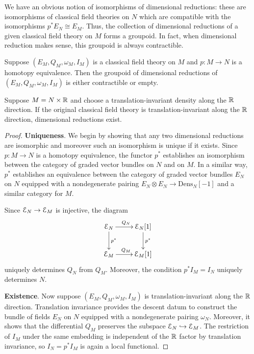 \documentclass[10pt, oneside]{article}
\newcommand{\Dens}{\mathrm{Dens}}
\begin{document}
We have an obvious notion of isomorphisms of dimensional reductions: these are isomorphisms of classical field theories on $N$ which are compatible with the isomorphisms $p^* E_N\cong E_M$. Thus, the collection of dimensional reductions of a given classical field theory on $M$ forms a groupoid.  In fact, when dimensional reduction makes sense, this groupoid is always contractible.

\begin{prop}
Suppose $(E_M, Q_M, \omega_M, I_M)$ is a classical field theory on $M$ and $p\colon M\rightarrow N$ is a homotopy equivalence. Then the groupoid of dimensional reductions of $(E_M, Q_M, \omega_M, I_M)$ is either contractible or empty.

Suppose $M=N\times \mathbb R$ and choose a translation-invariant density along the $\mathbb R$ direction. If the original classical field theory is translation-invariant along the $\mathbb R$ direction, dimensional reductions exist.
\label{prop:dimensionalreductionunique}
\end{prop}
\begin{proof} \textbf{Uniqueness}. We begin by showing that any two dimensional reductions are isomorphic and moreover such an isomorphism is unique if it exists. Since $p\colon M\rightarrow N$ is a homotopy equivalence, the functor $p^*$ establishes an isomorphism between the category of graded vector bundles on $N$ and on $M$. In a similar way, $p^*$ establishes an equivalence between the category of graded vector bundles $E_N$ on $N$ equipped with a nondegenerate pairing $E_N\otimes E_N\rightarrow \Dens_N[-1]$ and a similar category for $M$.

Since $\mathcal E_N\rightarrow \mathcal E_M$ is injective, the diagram
\[
\xymatrix{
\cE_N \ar^{Q_N}[r] \ar^{p^*}[d] & \cE_N[1] \ar^{p^*}[d] \\
\cE_M \ar^{Q_M}[r] & \cE_M[1]
}
\]
uniquely determines $Q_N$ from $Q_M$. Moreover, the condition $p^* I_M = I_N$ uniquely determines $N$.

\textbf{Existence}. Now suppose $(E_M, Q_M, \omega_M, I_M)$ is translation-invariant along the $\mathbb R$ direction. Translation invariance provides the descent datum to construct the bundle of fields $E_N$ on $N$ equipped with a nondegenerate pairing $\omega_N$. Moreover, it shows that the differential $Q_M$ preserves the subspace $\mathcal E_N\hookrightarrow \mathcal E_M$. The restriction of $I_M$ under the same embedding is independent of the $\mathbb R$ factor by translation invariance, so $I_N=p^* I_M$ is again a local functional.
\end{proof}
\end{document}
